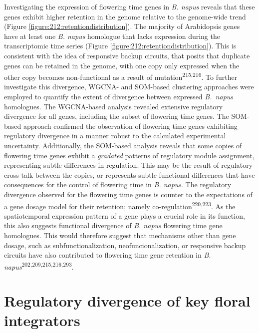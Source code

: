 \documentclass[12pt,]{book}
\begin{document}
Investigating the expression of flowering time genes in \emph{B. napus}
reveals that these genes exhibit higher retention in the genome relative
to the genome-wide trend (Figure
\ref{figure:212:retentiondistribution}). The majority of Arabidopsis
genes have at least one \emph{B. napus} homologue that lacks expression
during the transcriptomic time series (Figure
\ref{figure:212:retentiondistribution}). This is consistent with the
idea of responsive backup circuits, that posits that duplicate genes can
be retained in the genome, with one copy only expressed when the other
copy becomes non-functional as a result of
mutation\textsuperscript{215,216}. To further investigate this
divergence, WGCNA- and SOM-based clustering approaches were employed to
quantify the extent of divergence between expressed \emph{B.~napus}
homologues. The WGCNA-based analysis revealed extensive regulatory
divergence for all genes, including the subset of flowering time genes.
The SOM-based approach confirmed the observation of flowering time genes
exhibiting regulatory divergence in a manner robust to the calculated
experimental uncertainty. Additionally, the SOM-based analysis reveals
that some copies of flowering time genes exhibit a \emph{gradated}
patterns of regulatory module assignment, representing subtle
differences in regulation. This may be the result of regulatory
cross-talk between the copies, or represents subtle functional
differences that have consequences for the control of flowering time in
\emph{B. napus}. The regulatory divergence observed for the flowering
time genes is counter to the expectations of a gene dosage model for
their retention; namely co-regulation\textsuperscript{220,223}. As the
spatiotemporal expression pattern of a gene plays a crucial role in its
function, this also suggests functional divergence of \emph{B. napus}
flowering time gene homologues. This would therefore suggest that
mechanisms other than gene dosage, such as subfunctionalization,
neofuncionalization, or responsive backup circuits have also contributed
to flowering time gene retention in \emph{B.
napus}\textsuperscript{202,209,215,216,293}.

\section{Regulatory divergence of key floral
integrators}\label{section:spring:floralintegrators}
\end{document}
